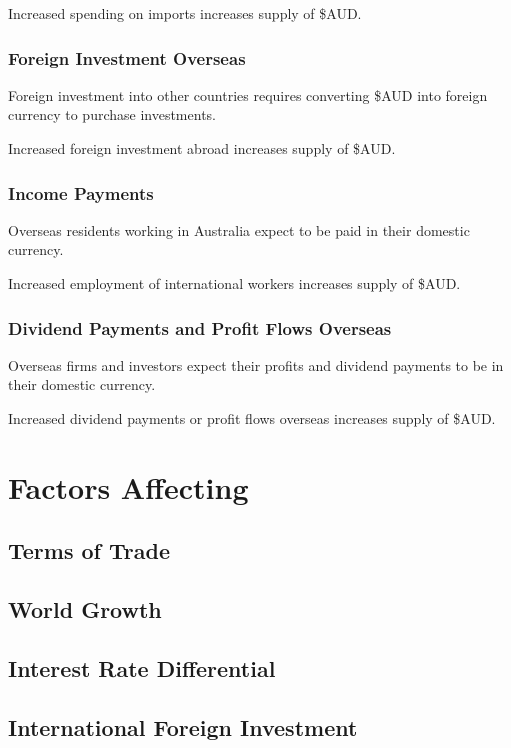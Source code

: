 \documentclass[a4paper,11pt]{article}
\begin{document}
Increased spending on imports increases supply of \$AUD.


\subsubsection{Foreign Investment Overseas}

Foreign investment into other countries requires converting \$AUD into foreign
currency to purchase investments.

Increased foreign investment abroad increases supply of \$AUD.


\subsubsection{Income Payments}

Overseas residents working in Australia expect to be paid in their domestic
currency.

Increased employment of international workers increases supply of \$AUD.


\subsubsection{Dividend Payments and Profit Flows Overseas}

Overseas firms and investors expect their profits and dividend payments to be
in their domestic currency.

Increased dividend payments or profit flows overseas increases supply of \$AUD.




\section{Factors Affecting}

\subsection{Terms of Trade}

\subsection{World Growth}

\subsection{Interest Rate Differential}

\subsection{International Foreign Investment}
\end{document}
